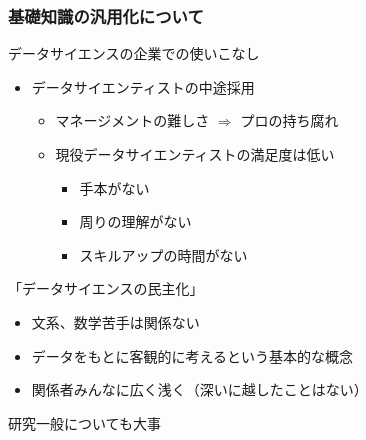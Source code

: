 \documentclass[12pt, dvipdfmx]{beamer}
\begin{document}
\begin{frame}
    \frametitle{基礎知識の汎用化について}
        \begin{exampleblock}{データサイエンスの企業での使いこなし}
            \begin{itemize}
                \item データサイエンティストの中途採用
                \begin{itemize}
                    \item マネージメントの難しさ $\Rightarrow$ プロの持ち腐れ
                    \item 現役データサイエンティストの満足度は低い
                    \begin{itemize}
                        \item 手本がない
                        \item 周りの理解がない
                        \item スキルアップの時間がない
                    \end{itemize}
                \end{itemize}
            \end{itemize}
        \end{exampleblock}
        \begin{alertblock}{「データサイエンスの民主化」}
            \begin{itemize}
                \item 文系、数学苦手は関係ない
                \item データをもとに客観的に考えるという基本的な概念
                \item 関係者みんなに広く浅く（深いに越したことはない）
            \end{itemize}
        \end{alertblock}
        \centering
        \Large{\alert{研究一般についても大事}}
\end{frame}
\end{document}
